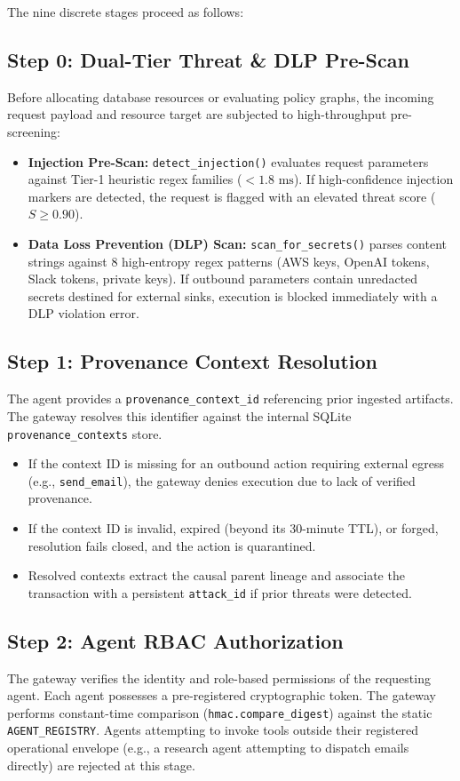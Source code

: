 The nine discrete stages proceed as follows:

\subsection{Step 0: Dual-Tier Threat \& DLP Pre-Scan}
Before allocating database resources or evaluating policy graphs, the incoming request payload and resource target are subjected to high-throughput pre-screening:
\begin{itemize}
    \item \textbf{Injection Pre-Scan:} \texttt{detect\_injection()} evaluates request parameters against Tier-1 heuristic regex families ($< 1.8\text{ ms}$). If high-confidence injection markers are detected, the request is flagged with an elevated threat score ($S \ge 0.90$).
    \item \textbf{Data Loss Prevention (DLP) Scan:} \texttt{scan\_for\_secrets()} parses content strings against 8 high-entropy regex patterns (AWS keys, OpenAI tokens, Slack tokens, private keys). If outbound parameters contain unredacted secrets destined for external sinks, execution is blocked immediately with a DLP violation error.
\end{itemize}

\subsection{Step 1: Provenance Context Resolution}
The agent provides a \texttt{provenance\_context\_id} referencing prior ingested artifacts. The gateway resolves this identifier against the internal SQLite \texttt{provenance\_contexts} store.
\begin{itemize}
    \item If the context ID is missing for an outbound action requiring external egress (e.g., \texttt{send\_email}), the gateway denies execution due to lack of verified provenance.
    \item If the context ID is invalid, expired (beyond its 30-minute TTL), or forged, resolution fails closed, and the action is quarantined.
    \item Resolved contexts extract the causal parent lineage and associate the transaction with a persistent \texttt{attack\_id} if prior threats were detected.
\end{itemize}

\subsection{Step 2: Agent RBAC Authorization}
The gateway verifies the identity and role-based permissions of the requesting agent. Each agent possesses a pre-registered cryptographic token. The gateway performs constant-time comparison (\texttt{hmac.compare\_digest}) against the static \texttt{AGENT\_REGISTRY}. Agents attempting to invoke tools outside their registered operational envelope (e.g., a research agent attempting to dispatch emails directly) are rejected at this stage.

